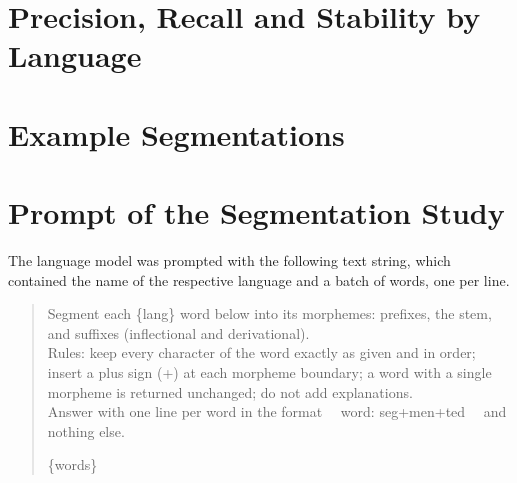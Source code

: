 \section{Precision, Recall and Stability by Language}\label{app:tables}






\section{Example Segmentations}\label{app:examples}


\section{Prompt of the Segmentation Study}\label{app:prompt}
The language model was prompted with the following text string, which contained the name of the respective language and a batch of words, one per line.
\begin{quote}\small\ttfamily\raggedright
Segment each \{lang\} word below into its morphemes: prefixes, the stem, and suffixes (inflectional and derivational).\\
Rules: keep every character of the word exactly as given and in order; insert a plus sign ({+}) at each morpheme boundary; a word with a single morpheme is returned unchanged; do not add explanations.\\
Answer with one line per word in the format \ \ word: seg{+}men{+}ted \ \ and nothing else.\par\medskip
\{words\}
\end{quote}

